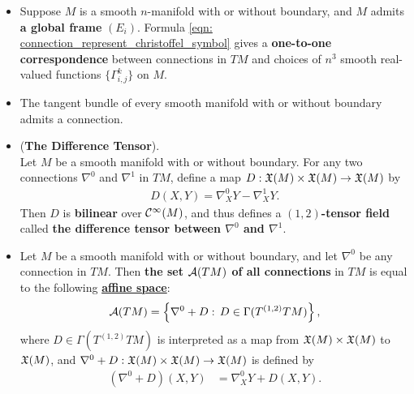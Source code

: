 \documentclass[11pt]{article}
\begin{document}
\begin{itemize}
\item \begin{lemma}
Suppose $M$ is a smooth $n$-manifold with or without boundary, and $M$ admits \textbf{a global frame} $(E_i)$. Formula \eqref{eqn: connection_represent_christoffel_symbol} gives a \textbf{one-to-one correspondence} between connections in $TM$ and choices of $n^3$ smooth real-valued functions $\{\Gamma_{i,j}^{k}\}$ on $M$.
\end{lemma}

\item \begin{proposition}
The tangent bundle of every smooth manifold with or without boundary admits a connection.
\end{proposition}

\item 
\begin{proposition} (\textbf{The Difference Tensor}). \\
Let $M$ be a smooth manifold with or without boundary. For any two connections $\nabla^0$ and $\nabla^1$ in $TM$, define a map $D: {\mathfrak X}(M) \times {\mathfrak X}(M) \rightarrow {\mathfrak X}(M)$ by
\begin{align*}
D(X, Y) = \nabla^0_{X}{Y} -\nabla^1_{X}{Y}.
\end{align*} Then $D$ is \textbf{bilinear} over ${\mathcal C}^{\infty}(M)$, and thus defines a \textbf{$(1,2)$-tensor field} called \textbf{the difference tensor between $\nabla^0$ and $\nabla^1$}.
\end{proposition}

\item \begin{theorem}
Let $M$ be a smooth manifold with or without boundary, and let $\nabla^0$ be any connection in $TM$. Then \textbf{the set ${\mathcal A}(TM)$ of all connections} in $TM$ is equal
to the following \underline{\textbf{affine space}}:
\begin{align*}
{\mathcal A}(TM) = \left\{\nabla^0 + D:\, D \in \Gamma(T^{(1,2)}TM)\right\},
\end{align*} 
where $D \in \Gamma(T^{(1,2)}TM)$ is interpreted as a map from $ {\mathfrak X}(M) \times {\mathfrak X}(M)$ to ${\mathfrak X}(M)$, and $\nabla^0 + D: {\mathfrak X}(M) \times {\mathfrak X}(M) \rightarrow {\mathfrak X}(M)$ is defined by
\begin{align*}
(\nabla^0 + D)(X, Y) &= \nabla^0_{X}{Y} + D(X, Y).
\end{align*}
\end{theorem}


\end{itemize}
\end{document}
